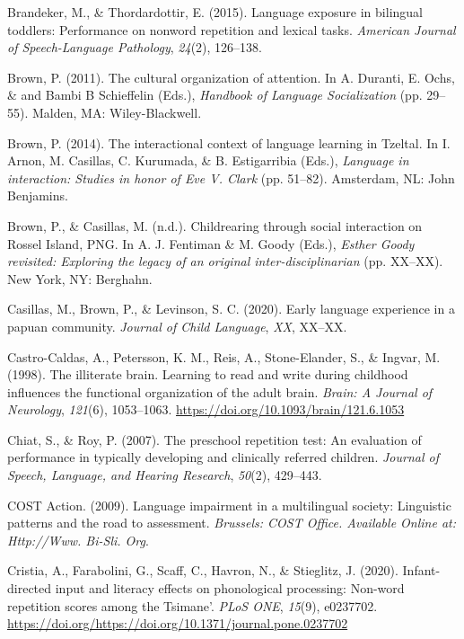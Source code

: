 \documentclass[english,,man,floatsintext]{apa6}
\begin{document}
\leavevmode\hypertarget{ref-brandeker2015language}{}%
Brandeker, M., \& Thordardottir, E. (2015). Language exposure in bilingual toddlers: Performance on nonword repetition and lexical tasks. \emph{American Journal of Speech-Language Pathology}, \emph{24}(2), 126--138.

\leavevmode\hypertarget{ref-brown2011cultural}{}%
Brown, P. (2011). The cultural organization of attention. In A. Duranti, E. Ochs, \& and Bambi B Schieffelin (Eds.), \emph{Handbook of Language Socialization} (pp. 29--55). Malden, MA: Wiley-Blackwell.

\leavevmode\hypertarget{ref-brown2014interactional}{}%
Brown, P. (2014). The interactional context of language learning in Tzeltal. In I. Arnon, M. Casillas, C. Kurumada, \& B. Estigarribia (Eds.), \emph{Language in interaction: Studies in honor of Eve V. Clark} (pp. 51--82). Amsterdam, NL: John Benjamins.

\leavevmode\hypertarget{ref-brownIPchildrearing}{}%
Brown, P., \& Casillas, M. (n.d.). Childrearing through social interaction on Rossel Island, PNG. In A. J. Fentiman \& M. Goody (Eds.), \emph{Esther Goody revisited: Exploring the legacy of an original inter-disciplinarian} (pp. XX--XX). New York, NY: Berghahn.

\leavevmode\hypertarget{ref-casillas2020early}{}%
Casillas, M., Brown, P., \& Levinson, S. C. (2020). Early language experience in a papuan community. \emph{Journal of Child Language}, \emph{XX}, XX--XX.

\leavevmode\hypertarget{ref-castro1998illiterate}{}%
Castro-Caldas, A., Petersson, K. M., Reis, A., Stone-Elander, S., \& Ingvar, M. (1998). The illiterate brain. Learning to read and write during childhood influences the functional organization of the adult brain. \emph{Brain: A Journal of Neurology}, \emph{121}(6), 1053--1063. \url{https://doi.org/10.1093/brain/121.6.1053}

\leavevmode\hypertarget{ref-chiat2007preschool}{}%
Chiat, S., \& Roy, P. (2007). The preschool repetition test: An evaluation of performance in typically developing and clinically referred children. \emph{Journal of Speech, Language, and Hearing Research}, \emph{50}(2), 429--443.

\leavevmode\hypertarget{ref-is08042009language}{}%
COST Action. (2009). Language impairment in a multilingual society: Linguistic patterns and the road to assessment. \emph{Brussels: COST Office. Available Online at: Http://Www. Bi-Sli. Org}.

\leavevmode\hypertarget{ref-cristia2020infant}{}%
Cristia, A., Farabolini, G., Scaff, C., Havron, N., \& Stieglitz, J. (2020). Infant-directed input and literacy effects on phonological processing: Non-word repetition scores among the Tsimane'. \emph{PLoS ONE}, \emph{15}(9), e0237702. \url{https://doi.org/https://doi.org/10.1371/journal.pone.0237702}
\end{document}

